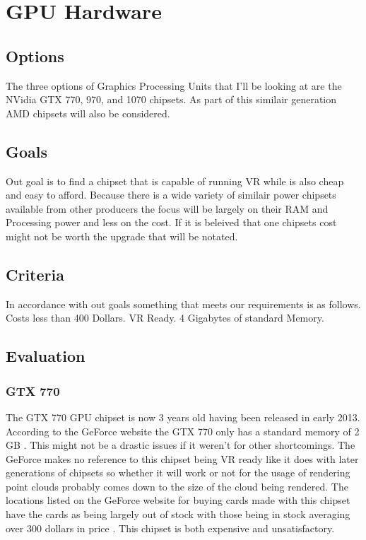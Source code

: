 \documentclass{article}
\begin{document}
\section{GPU Hardware}
\subsection{Options}
The three options of Graphics Processing Units that I'll be looking at are the NVidia GTX 770, 970, and 1070 chipsets. As part of this similair generation AMD chipsets  will also be considered.

\subsection{Goals}
Out goal is to find a chipset that is capable of running VR while is also cheap and easy to afford. Because there is a wide variety of similair power chipsets available from other producers the focus will be largely on their RAM and Processing power and less on the cost. If it is beleived that one chipsets cost might not be worth the upgrade that will be notated.

\subsection{Criteria}
In accordance with out goals something that meets our requirements is as follows.
Costs less than 400 Dollars.
VR Ready.
4 Gigabytes of standard Memory.

\subsection{Evaluation}
\subsubsection{GTX 770}
The GTX 770 GPU chipset is now 3 years old having been released in early 2013.
According to the GeForce website the GTX 770 only has a standard memory of 2 GB \cite{geforce}.
This might not be a drastic issues if it weren't for other shortcomings.
The GeForce makes no reference to this chipset being VR ready like it does with later generations of chipsets so whether it will work or not for the usage of rendering point clouds probably comes down to the size of the cloud being rendered.
The locations listed on the GeForce website for buying cards made with this chipset have the cards as being largely out of stock with those being in stock averaging over 300 dollars in price \cite{geforce}.
This chipset is both expensive and unsatisfactory.
\end{document}
